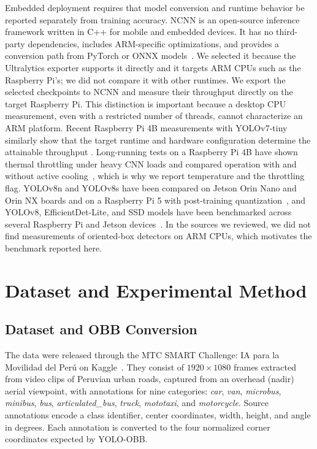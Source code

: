 \documentclass[runningheads]{llncs}
\begin{document}
Embedded deployment requires that model conversion and runtime behavior be
reported separately from training accuracy. NCNN is an open-source inference
framework written in C++ for mobile and embedded devices. It has no third-party
dependencies, includes ARM-specific optimizations, and provides a conversion
path from PyTorch or ONNX models~\cite{ncnn}. We selected it because the
Ultralytics exporter supports it directly and it targets ARM CPUs such as the
Raspberry Pi's; we did not compare it with other runtimes. We export the
selected checkpoints to NCNN and measure their throughput directly on the target
Raspberry Pi. This distinction is important because a desktop CPU measurement,
even with a restricted number of threads, cannot characterize an ARM platform.
Recent Raspberry Pi 4B measurements with YOLOv7-tiny similarly show that the
target runtime and hardware configuration determine the attainable throughput
\cite{santos2024edge}. Long-running tests on a Raspberry Pi 4B have shown
thermal throttling under heavy CNN loads and compared operation with and
without active cooling~\cite{benoitcattin2020thermal}, which is why we report
temperature and the throttling flag. YOLOv8n and YOLOv8s have been compared on
Jetson Orin Nano and Orin NX boards and on a Raspberry Pi 5 with post-training
quantization~\cite{rey2025yoloedgedrone}, and YOLOv8, EfficientDet-Lite, and SSD
models have been benchmarked across several Raspberry Pi and Jetson
devices~\cite{alqahtani2024edgebench}. In the sources we reviewed, we did not
find measurements of oriented-box detectors on ARM CPUs, which motivates the
benchmark reported here.

\section{Dataset and Experimental Method}
\label{sec:dataset}

\subsection{Dataset and OBB Conversion}

The data were released through the MTC SMART Challenge: IA para la Movilidad del
Per\'u on Kaggle~\cite{mtcsmartchallenge}. They consist of $1920\times1080$
frames extracted from video clips of Peruvian urban roads, captured from an
overhead (nadir) aerial viewpoint, with annotations for nine categories:
\textit{car}, \textit{van}, \textit{microbus}, \textit{minibus}, \textit{bus},
\textit{articulated\_bus}, \textit{truck}, \textit{mototaxi}, and
\textit{motorcycle}. Source annotations encode a class identifier, center
coordinates, width, height, and angle in degrees. Each annotation is converted
to the four normalized corner coordinates expected by YOLO-OBB.
\end{document}
